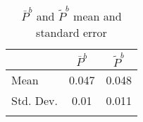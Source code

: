 \begin{table}[h!]
\centering
\caption{$\bar{P}^b$ and $\tilde{P}^b$ mean and standard error}\label{tab:pb-comp}
\begin{tabular}{lcc}
 \hline 
 & $\bar{P}^b$ & $\tilde{P}^b$ \\ 
\hline
Mean &0.047 & 0.048\\
Std. Dev. & 0.01&0.011\\\hline\\
\end{tabular}
\end{table}

